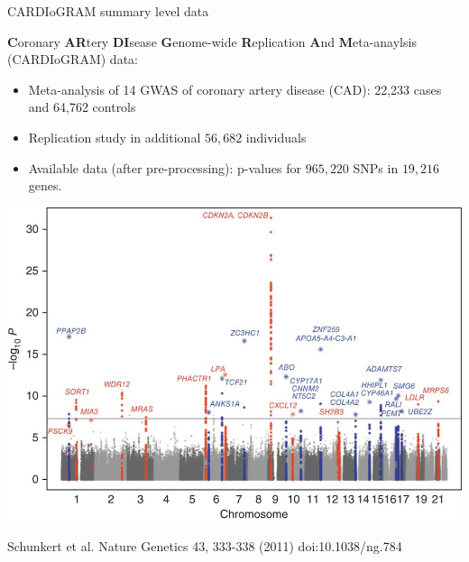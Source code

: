 \begin{frame}{CARDIoGRAM summary level data}

{\bf C}oronary {\bf AR}tery {\bf DI}sease {\bf G}enome-wide {\bf R}eplication {\bf A}nd {\bf M}eta-anaylsis (CARDIoGRAM) data:

\begin{itemize}
\item Meta-analysis of 14 GWAS of coronary artery disease (CAD): 22,233 cases and 64,762 controls
\item Replication study in additional $56,682$ individuals
\item Available data (after pre-processing): p-values for $965,220$ SNPs in $19,216$ genes.  
\end{itemize}
\end{frame}

\begin{frame}
\includegraphics[angle=0,width=1\textwidth]{ng784-F1.jpg}

\scriptsize Schunkert et al. Nature Genetics 43,  333-338 (2011) doi:10.1038/ng.784
    
\end{frame}

